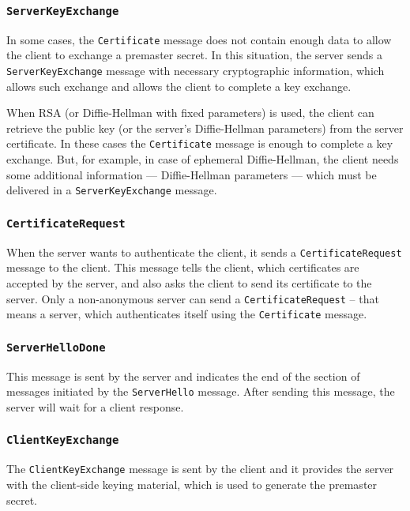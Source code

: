 \subsubsection{\texttt{ServerKeyExchange}}
    In some cases, the \texttt{Certificate} message does not contain enough data to
    allow the client to exchange a premaster secret. In this situation, the
    server sends a \texttt{ServerKeyExchange} message with necessary cryptographic
    information, which allows such exchange and allows the client to complete
    a key exchange.

    When RSA (or Diffie-Hellman with fixed parameters) is used, the client can retrieve
    the public key (or the server's Diffie-Hellman parameters) from the server certificate.
    In these cases the \texttt{Certificate} message is enough to complete
    a key exchange. But, for example, in case of ephemeral Diffie-Hellman, the client
    needs some additional information --- Diffie-Hellman parameters --- which
    must be delivered in a \texttt{ServerKeyExchange} message.

\subsubsection{\texttt{CertificateRequest}}
    When the server wants to authenticate the client, it sends
    a \texttt{CertificateRequest} message to the client. This message tells
    the client, which certificates are accepted by the server, and also asks
    the client to send its certificate to the server. Only a non-anonymous
    server can send a \texttt{CertificateRequest} -- that means a server, which
    authenticates itself using the \texttt{Certificate} message.

\subsubsection{\texttt{ServerHelloDone}}
    This message is sent by the server and indicates the end of the section
    of messages initiated by the \texttt{ServerHello} message. After sending
    this message, the server will wait for a client response.

\subsubsection{\texttt{ClientKeyExchange}}
    The \texttt{ClientKeyExchange} message is sent by the client and it provides
    the server with the client-side keying material, which is used to generate
    the premaster secret.

